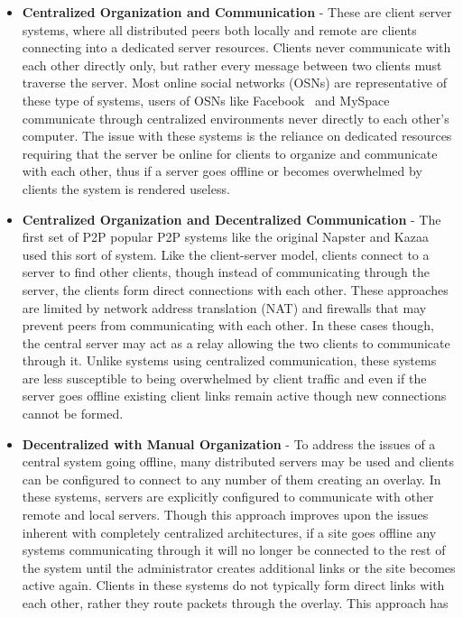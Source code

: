 \begin{itemize}
\item \textbf{Centralized Organization and Communication} - These are client
server systems, where all distributed peers both locally and remote are clients
connecting into a dedicated server resources.  Clients never communicate with
each other directly only, but rather every message between two clients must
traverse the server.  Most online social networks (OSNs) are representative of
these type of systems, users of OSNs like Facebook~\cite{facebook} and
MySpace~\cite{myspace} communicate through centralized environments never
directly to each other's computer.  The issue with these systems is the reliance
on dedicated resources requiring that the server be online for clients to
organize and communicate with each other, thus if a server goes offline or
becomes overwhelmed by clients the system is rendered useless.
\item \textbf{Centralized Organization and Decentralized Communication} - The
first set of P2P popular P2P systems like the original Napster
and Kazaa used this sort of system.  Like the client-server model,
clients connect to a server to find other clients, though instead of
communicating through the server, the clients form direct connections with each
other.  These approaches are limited by network address translation (NAT) and
firewalls that may prevent peers from communicating with each other.  In these
cases though, the central server may act as a relay allowing the two clients to
communicate through it.  Unlike systems using centralized communication, these
systems are less susceptible to being overwhelmed by client traffic and even if
the server goes offline existing client links remain active though new
connections cannot be formed.
\item \textbf{Decentralized with Manual Organization} - To address the issues
of a central system going offline, many distributed servers may be used and
clients can be configured to connect to any number of them creating an overlay.
In these systems, servers are explicitly configured to communicate with other
remote and local servers.  Though this approach improves upon the issues
inherent with completely centralized architectures, if a site goes offline any
systems communicating through it will no longer be connected to the rest of the
system until the administrator creates additional links or the site becomes
active again.  Clients in these systems do not typically form direct links with
each other, rather they route packets through the overlay.  This approach has

\end{itemize}
